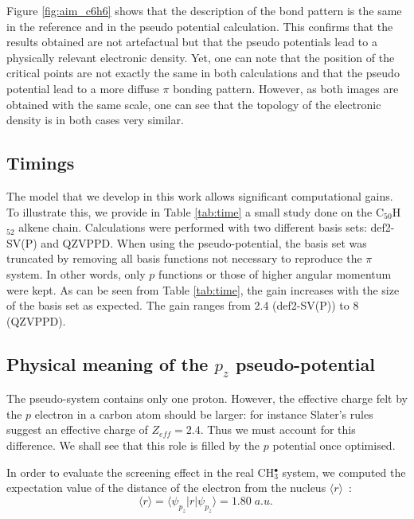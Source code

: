 \documentclass[12pt]{article}
\begin{document}
Figure \ref{fig:aim_c6h6} shows that the description of the bond pattern is the same
in the reference and in the pseudo potential calculation.
This confirms that the results obtained are not artefactual but that the pseudo potentials
lead to a physically relevant electronic density.
Yet, one can note that the position of the critical points are not exactly the same in both
calculations and that the pseudo potential lead to a more diffuse $\pi$ bonding pattern.
However, as both images are obtained with the same scale, one can see that the topology
of the electronic density is in both cases very similar.

\subsection*{\sffamily \large Timings}
The model that we develop in this work allows significant computational gains.
To illustrate this, we provide in Table \ref{tab:time} a small study done on the C$_{50}$H$_{52}$
alkene chain.
Calculations were performed with two different basis sets: def2-SV(P) and QZVPPD.
When using the pseudo-potential, the basis set was truncated by removing all
basis functions not necessary to reproduce the
$\pi$ system.
In other words, only $p$ functions or those of higher angular momentum were kept.
As can be seen from Table \ref{tab:time}, the gain increases
with the size of the basis set as expected.
The gain ranges from 2.4 (def2-SV(P)) to 8 (QZVPPD).

\subsection*{\sffamily \large Physical meaning of the \(p_{z}\) pseudo-potential} \label{minimalpotguess}

The pseudo-system contains only one proton. However, the effective charge felt by the $p$ electron in a carbon atom should be larger: for instance Slater's rules suggest an effective charge of $Z_{eff}=2.4$. Thus we must account for this difference. We shall see that this role is filled by the $p$ potential once optimised. 

In order to evaluate the screening effect in the real CH\(^{\bullet}_{3}\) system, we computed the expectation value of the distance of the electron from the nucleus \( \langle r \rangle \)~:
\begin{equation}
\langle r \rangle = \langle \psi_{p_{z}} | r | \psi_{p_{z}} \rangle = 1.80\;a.u.\
\label{equation:exp_r}
\end{equation}
\end{document}
